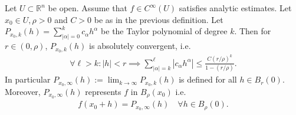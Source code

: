 
\begin{theorem}\label{thm:analytic-expansion}
	Let $U \subset \mathbb{R}^{n}$ be open. Assume that $f \in C^{\infty}(U)$ satisfies analytic estimates. Let $x_{0} \in U, \rho > 0$ and $C > 0$ be as in the previous definition. Let $P_{x_{0}, k}(h) = \sum_{\left| \alpha \right| = 0}^{k} c_{\alpha }h^{\alpha}$ be the Taylor polynomial of degree $k$. Then for $r \in (0, \rho)$, $P_{x_{0},k}(h)$ is absolutely convergent, i.e.
	\begin{align*}
		\forall \ell > k: \left| h \right| < r \implies \sum_{\left| \alpha  \right| = k}^{\ell}  \left| c_{\alpha} h^{\alpha } \right| \leq \frac{C (r / \rho)^{k}}{1 - (r / \rho)}.
	\end{align*}
	In particular $P_{x_{0}, \infty}(h) := \lim_{k \to \infty} P_{x_{0}, k}(h)$ is defined for all $h \in B_{r}(0)$. Moreover, $P_{x_{0}, \infty}(h)$ represents $f$ in $B_{\rho}(x_{0})$ i.e.
	\begin{align*}
		f(x_{0} + h) = P_{x_{0}, \infty}(h) \quad \forall h \in B_{\rho}(0).
	\end{align*}
\end{theorem}
\newpage
